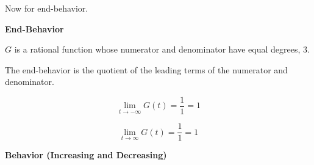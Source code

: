 \documentclass{ximera}
\begin{document}
Now for end-behavior. 








\textbf{\textcolor{purple!85!blue}{End-Behavior}} 

\begin{explanation}

$G$ is a rational function whose numerator and denominator have equal degrees, $3$.

The end-behavior is the quotient of the leading terms of the numerator and denominator.

\[
\lim\limits_{t \to -\infty} G(t) = \frac{1}{1} = 1
\]


\[
\lim\limits_{t \to \infty} G(t) = \frac{1}{1} = 1
\]

\end{explanation}























\textbf{\textcolor{purple!85!blue}{Behavior (Increasing and Decreasing)}} 
\end{document}
